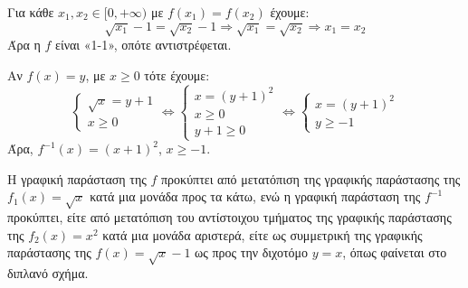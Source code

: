 \begin{alist}
    \item [\textbf{α)}] Για κάθε $x_1, x_2 \in [0, +\infty)$ με $f(x_1)=f(x_2)$ έχουμε:
    \[ \sqrt{x_1}-1 = \sqrt{x_2}-1 \Rightarrow \sqrt{x_1} = \sqrt{x_2} \Rightarrow x_1=x_2 \]
    Άρα η $f$ είναι «1-1», οπότε αντιστρέφεται.

    \item [\textbf{β)}] Αν $f(x)=y$, με $x \ge 0$ τότε έχουμε:
    \[ \left\{ \begin{array}{l} \sqrt{x}=y+1 \\ x \ge 0 \end{array} \right. \Leftrightarrow \left\{ \begin{array}{l} x=(y+1)^2 \\ x \ge 0 \\ y+1 \ge 0 \end{array} \right. \Leftrightarrow \left\{ \begin{array}{l} x=(y+1)^2 \\ y \ge -1 \end{array} \right. \]
    Άρα, $f^{-1}(x)=(x+1)^2$, $x \ge -1$.

    \item [\textbf{γ)}] Η γραφική παράσταση της $f$ προκύπτει από μετατόπιση της γραφικής παράστασης της $f_1(x)=\sqrt{x}$ κατά μια μονάδα προς τα κάτω, ενώ η γραφική παράσταση της $f^{-1}$ προκύπτει, είτε από μετατόπιση του αντίστοιχου τμήματος της γραφικής παράστασης της $f_2(x)=x^2$ κατά μια μονάδα αριστερά, είτε ως συμμετρική της γραφικής παράστασης της $f(x)=\sqrt{x}-1$ ως προς την διχοτόμο $y=x$, όπως φαίνεται στο διπλανό σχήμα.
\end{alist}